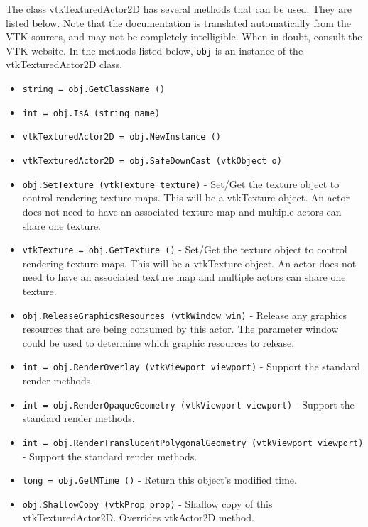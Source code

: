 The class vtkTexturedActor2D has several methods that can be used.
  They are listed below.
Note that the documentation is translated automatically from the VTK sources,
and may not be completely intelligible.  When in doubt, consult the VTK website.
In the methods listed below, \verb|obj| is an instance of the vtkTexturedActor2D class.
\begin{itemize}
\item  \verb|string = obj.GetClassName ()|

\item  \verb|int = obj.IsA (string name)|

\item  \verb|vtkTexturedActor2D = obj.NewInstance ()|

\item  \verb|vtkTexturedActor2D = obj.SafeDownCast (vtkObject o)|

\item  \verb|obj.SetTexture (vtkTexture texture)| -  Set/Get the texture object to control rendering texture maps.  This will
 be a vtkTexture object. An actor does not need to have an associated
 texture map and multiple actors can share one texture.

\item  \verb|vtkTexture = obj.GetTexture ()| -  Set/Get the texture object to control rendering texture maps.  This will
 be a vtkTexture object. An actor does not need to have an associated
 texture map and multiple actors can share one texture.

\item  \verb|obj.ReleaseGraphicsResources (vtkWindow win)| -  Release any graphics resources that are being consumed by this actor.
 The parameter window could be used to determine which graphic
 resources to release.

\item  \verb|int = obj.RenderOverlay (vtkViewport viewport)| -  Support the standard render methods.

\item  \verb|int = obj.RenderOpaqueGeometry (vtkViewport viewport)| -  Support the standard render methods.

\item  \verb|int = obj.RenderTranslucentPolygonalGeometry (vtkViewport viewport)| -  Support the standard render methods.

\item  \verb|long = obj.GetMTime ()| -  Return this object's modified time.

\item  \verb|obj.ShallowCopy (vtkProp prop)| -  Shallow copy of this vtkTexturedActor2D. Overrides vtkActor2D method.

\end{itemize}
